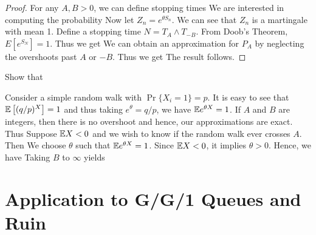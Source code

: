 \documentclass[a4paper,10pt,english]{article}
\begin{document}
\begin{proof}
For any $A,B > 0$, we can define stopping times
We are interested in computing the probability 
Now let $Z_n = e^{\theta S_n}$. We can see that $Z_n$ is a martingale with mean 1. 
Define a stopping time $N = T_A \wedge T_{-B}$. 
From Doob's Theorem, $E[e^{S_N}] = 1$. 
Thus we get
We can obtain an approximation for $P_A$ by neglecting the overshoots past $A$ or $-B$. 
Thus we get
The result follows. 
\end{proof}
\begin{cor} 
Show that 
\end{cor}
\begin{shaded*}
\begin{exmp} 
Consider a simple random walk with $\Pr\{X_i = 1\} = p$.  
It is easy to see that $\mathbb{E}\left[(q/p)^X\right] = 1$ and thus taking $e^\theta = q/p$, we have $\mathbb{E} e^{\theta X} = 1$.  
If $A$ and $B$ are integers, then there is no overshoot and hence, our approximations are exact. Thus
Suppose $\mathbb{E} X < 0$ and we wish to know if the random walk ever crosses $A$. 
Then
We choose  $\theta$ such that $\mathbb{E} e^{\theta X} = 1$. 
Since $\mathbb{E} X<0$, it implies $\theta > 0$. 
Hence, we have
Taking $B$ to $\infty$ yields

\end{exmp}
\end{shaded*}

\section{Application to G/G/1 Queues and Ruin}
\end{document}
